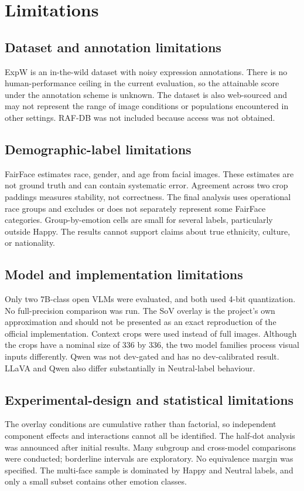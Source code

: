 \documentclass[lettersize,journal]{IEEEtran}
\begin{document}
\section{Limitations}
\subsection{Dataset and annotation limitations}
ExpW is an in-the-wild dataset with noisy expression annotations. There is no human-performance ceiling in the current evaluation, so the attainable score under the annotation scheme is unknown. The dataset is also web-sourced and may not represent the range of image conditions or populations encountered in other settings. RAF-DB was not included because access was not obtained.

\subsection{Demographic-label limitations}
FairFace estimates race, gender, and age from facial images. These estimates are not ground truth and can contain systematic error. Agreement across two crop paddings measures stability, not correctness. The final analysis uses operational race groups and excludes or does not separately represent some FairFace categories. Group-by-emotion cells are small for several labels, particularly outside Happy. The results cannot support claims about true ethnicity, culture, or nationality.

\subsection{Model and implementation limitations}
Only two 7B-class open VLMs were evaluated, and both used 4-bit quantization. No full-precision comparison was run. The SoV overlay is the project's own approximation and should not be presented as an exact reproduction of the official implementation. Context crops were used instead of full images. Although the crops have a nominal size of 336 by 336, the two model families process visual inputs differently. Qwen was not dev-gated and has no dev-calibrated result. LLaVA and Qwen also differ substantially in Neutral-label behaviour.

\subsection{Experimental-design and statistical limitations}
The overlay conditions are cumulative rather than factorial, so independent component effects and interactions cannot all be identified. The half-dot analysis was announced after initial results. Many subgroup and cross-model comparisons were conducted; borderline intervals are exploratory. No equivalence margin was specified. The multi-face sample is dominated by Happy and Neutral labels, and only a small subset contains other emotion classes.
\end{document}
